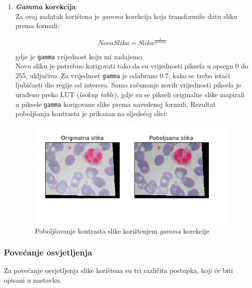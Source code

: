 \documentclass[12pt,a4paper]{article}
\begin{document}
\begin{enumerate}
\begin{figure}[H]
\end{figure}

\newpage

\item \textbf{\textit{Gamma} korekcija}: \\

Za ovaj zadatak korištena je \textit{gamma} korekcija koja transformiše datu sliku prema formuli:

\[NovaSlika = Slika^{\frac{1}{gamma}}\]

gdje je \texttt{gamma} vrijednost koju mi zadajemo. \\

Novu sliku je potrebno korigovati tako da su vrijednosti piksela u opsegu 0 do 255, uključivo. Za vrijednost \texttt{gamma} je odabrano 0.7, kako se treba istaći ljubičasti dio regije od interesa. Samo računanje novih vrijednosti piksela je urađeno preko LUT (\textit{lookup table}), gdje su se pikseli originalne slike mapirali u piksele \texttt{gamma} korigovane slike prema navedenoj formuli. Rezultat poboljšanja kontrasta je prikazan na sljedećoj slici:

\begin{figure}[H]

\center
\includegraphics[scale=0.9]{s5Kontrast3.png}
\caption{Poboljšavanje kontrasta slike korištenjem \textit{gamma} korekcije}
	
\end{figure}

\end{enumerate}

\newpage

\subsubsection{Povećanje osvjetljenja}

Za povećanje osvjetljenja slike korištena su tri različita postupka, koji će biti opisani u nastavku.
\end{document}
